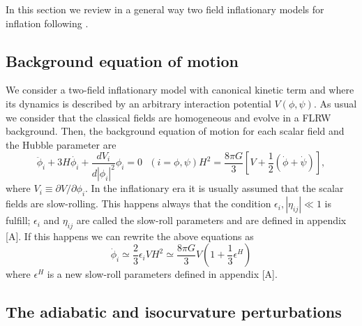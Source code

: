 \documentclass[amssymb,twocolumn,prd,nofootinbib,showpacs]{revtex4-1}
\begin{document}
In this section we review in a general way two field inflationary models for inflation following \cite{twofields}. 

\subsection{Background equation of motion}

We consider a two-field inflationary model with canonical kinetic term and where its dynamics is described by an arbitrary interaction potential $V(\phi,\psi)$. As usual we consider that the classical fields are homogeneous and evolve in a FLRW background. Then, the background equation of motion for each scalar field and the Hubble parameter are
\begin{subequations}
\begin{equation}\label{KGEq}
\ddot{\phi}_i+3H\dot{\phi_i}+\frac{dV_i}{d|\phi_i|^2}\phi_i=0 \ \ \ (i=\phi,\psi)
\end{equation}
\begin{equation}
H^2=\frac{8\pi G}{3}\left[V+\frac{1}{2}\left(\dot{\phi}+\dot\psi\right)\right],
\end{equation}
\end{subequations}
where $V_i\equiv\partial V/\partial \phi_i$. In the inflationary era it is usually assumed that the scalar fields are slow-rolling. This happens always that the condition $\epsilon_i,|\eta_{ij}|\ll 1$ is fulfill; $\epsilon_i$ and $\eta_{ij}$ are called the slow-roll parameters and are defined in appendix [A]. If this happens we can rewrite the above equations as
\begin{subequations}
\begin{equation}
\dot{\phi}_i\simeq \frac{2}{3}\epsilon_i V
\end{equation}
\begin{equation}
H^2\simeq \frac{8\pi G}{3}V\left(1+\frac{1}{3}\epsilon^H\right)
\end{equation}
\end{subequations}
where $\epsilon^H$ is a new slow-roll parameters defined in appendix [A]. 
\subsection{The adiabatic and isocurvature perturbations}
\end{document}
